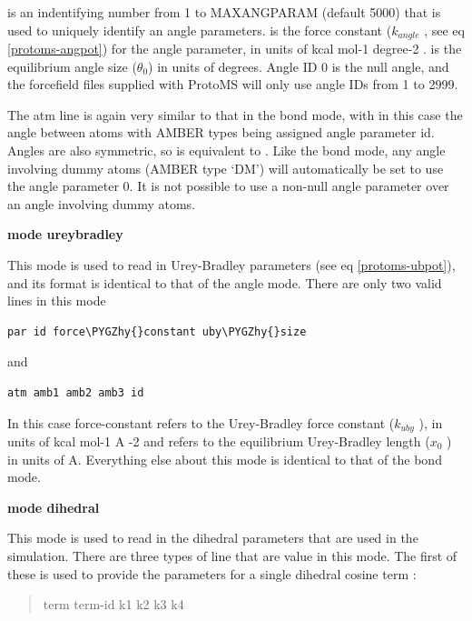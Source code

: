 \documentclass[letterpaper,10pt,english]{sphinxmanual}
\def\PYGZhy{\char`\-}
\begin{document}
 is an indentifying number from 1 to MAXANGPARAM (default 5000) that is used to uniquely identify an angle parameters.  is the force constant (\(k_{angle}\) , see eq \eqref{protoms-angpot}) for the angle parameter, in units of kcal mol-1 degree-2 .  is the equilibrium angle size (\(\theta_0\)) in units of degrees. Angle ID 0 is the null angle, and the forcefield files supplied with ProtoMS will only use angle IDs from 1 to 2999.

The atm line is again very similar to that in the bond mode, with in this case the angle between atoms with AMBER types  being assigned angle parameter id. Angles are also symmetric, so  is equivalent to . Like the bond mode, any angle involving dummy atoms (AMBER type ‘DM’) will automatically be set to use the angle parameter 0. It is not possible to use a non-null angle parameter over an angle involving dummy atoms.

\textbf{mode ureybradley}

This mode is used to read in Urey-Bradley parameters (see eq \eqref{protoms-ubpot}), and its format is identical to that of the angle mode. There are only two valid lines in this mode

\begin{Verbatim}[frame=single,commandchars=\\\{\}]
par id force\PYGZhy{}constant uby\PYGZhy{}size
\end{Verbatim}

and

\begin{Verbatim}[frame=single,commandchars=\\\{\}]
atm amb1 amb2 amb3 id
\end{Verbatim}

In this case force-constant refers to the Urey-Bradley force constant (\(k_{uby}\) ), in units of kcal mol-1 A -2 and  refers to the equilibrium Urey-Bradley length (\(x_0\) ) in units of A. Everything else about this mode is identical to that of the bond mode.

\textbf{mode dihedral}

This mode is used to read in the dihedral parameters that are used in the simulation. There are three types of line that are value in this mode. The first of these is used to provide the parameters for a single dihedral cosine term :
\begin{quote}

term term-id k1 k2 k3 k4
\end{quote}
\end{document}
